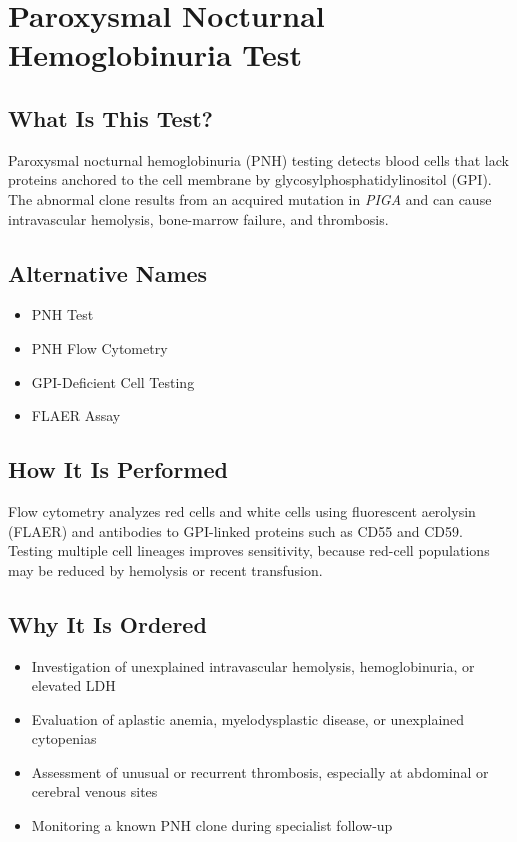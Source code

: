 \chapter{Paroxysmal Nocturnal Hemoglobinuria Test}

\section*{What Is This Test?}
Paroxysmal nocturnal hemoglobinuria (PNH) testing detects blood cells that lack proteins anchored to the cell membrane by glycosylphosphatidylinositol (GPI). The abnormal clone results from an acquired mutation in \textit{PIGA} and can cause intravascular hemolysis, bone-marrow failure, and thrombosis.

\section*{Alternative Names}
\begin{itemize}
  \item PNH Test
  \item PNH Flow Cytometry
  \item GPI-Deficient Cell Testing
  \item FLAER Assay
\end{itemize}
\section*{How It Is Performed}
Flow cytometry analyzes red cells and white cells using fluorescent aerolysin (FLAER) and antibodies to GPI-linked proteins such as CD55 and CD59. Testing multiple cell lineages improves sensitivity, because red-cell populations may be reduced by hemolysis or recent transfusion.

\section*{Why It Is Ordered}
\begin{itemize}
  \item Investigation of unexplained intravascular hemolysis, hemoglobinuria, or elevated LDH
  \item Evaluation of aplastic anemia, myelodysplastic disease, or unexplained cytopenias
  \item Assessment of unusual or recurrent thrombosis, especially at abdominal or cerebral venous sites
  \item Monitoring a known PNH clone during specialist follow-up
\end{itemize}

